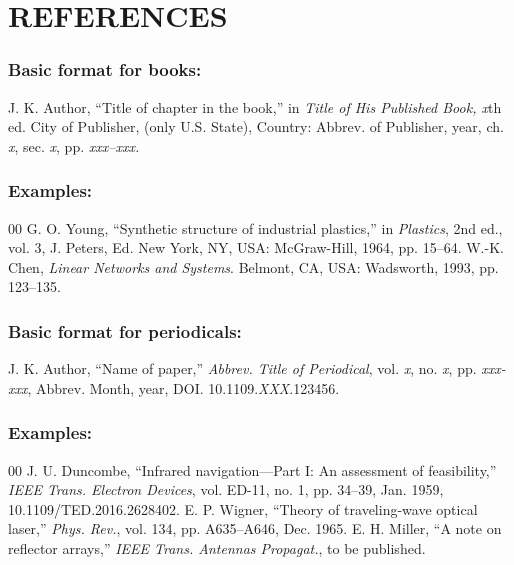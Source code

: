 \documentclass{IEEEoj}
\begin{document}
\section*{REFERENCES}

\def\refname{\vadjust{\vspace*{-1em}}} %

\subsubsection*{Basic format for books:}

J. K. Author, ``Title of chapter in the book,'' in \textit{Title of His Published Book, x}th ed. City of Publisher,
(only U.S. State), Country: Abbrev. of Publisher, year, ch. \textit{x}, sec. \textit{x}, pp.
\textit{xxx--xxx.}

\subsubsection*{Examples:}

\begin{thebibliography}{00}
 G. O. Young, ``Synthetic structure of industrial
plastics,'' in \emph{Plastics}, 2nd ed., vol. 3, J. Peters, Ed. New York, NY, USA: McGraw-Hill, 1964, pp. 15--64.
 W.-K. Chen, \emph{Linear Networks and Systems}. Belmont, CA, USA: Wadsworth, 1993, pp. 123--135.
\end{thebibliography}

\subsubsection*{Basic format for periodicals:}

J. K. Author, ``Name of paper,'' \textit{Abbrev. Title of
Periodical}, vol. \textit{x}, no. \textit{x}, pp. \textit{xxx-xxx}, Abbrev. Month, year, DOI.
10.1109.\textit{XXX}.123456.

\subsubsection*{Examples:}

\begin{thebibliography}{00}
 J. U. Duncombe, ``Infrared navigation---Part I: An
assessment of feasibility,'' \emph{IEEE Trans. Electron Devices}, vol. ED-11, no. 1, pp. 34--39, Jan. 1959, 10.1109/TED.2016.2628402.
 E. P. Wigner, ``Theory of traveling-wave optical laser,'' 
\emph{Phys. Rev.}, vol. 134, pp. A635--A646, Dec. 1965.
 E. H. Miller, ``A note on reflector arrays,'' \emph{IEEE
Trans. Antennas Propagat.}, to be published.
\end{thebibliography}
\end{document}
